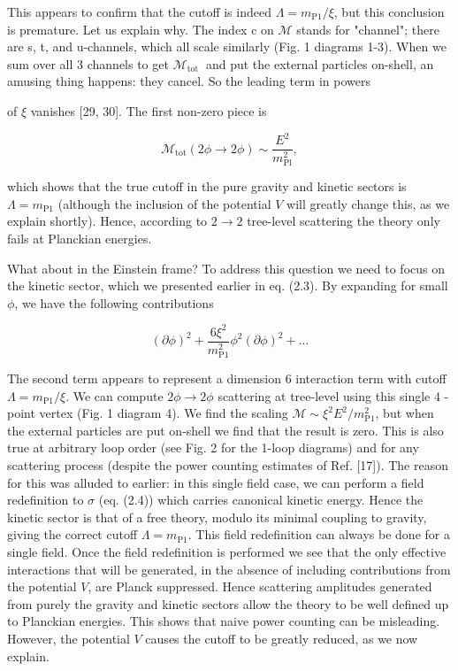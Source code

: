 This appears to confirm that the cutoff is indeed $\Lambda=m_{\mathrm{P} 1} / \xi$, but this conclusion is premature. Let us explain why. The index c on $\mathcal{M}$ stands for "channel"; there are s, t, and u-channels, which all scale similarly (Fig. 1 diagrams 1-3). When we sum over all 3 channels to get $\mathcal{M}_{\text {tot }}$ and put the external particles on-shell, an amusing thing happens: they cancel. So the leading term in powers

of $\xi$ vanishes [29, 30]. The first non-zero piece is

$$
\mathcal{M}_{\mathrm{tot}}(2 \phi \rightarrow 2 \phi) \sim \frac{E^2}{m_{\mathrm{Pl}}^2},
$$

which shows that the true cutoff in the pure gravity and kinetic sectors is $\Lambda=m_{\mathrm{P} 1}$ (although the inclusion of the potential $V$ will greatly change this, as we explain shortly). Hence, according to $2 \rightarrow 2$ tree-level scattering the theory only fails at Planckian energies.

What about in the Einstein frame? To address this question we need to focus on the kinetic sector, which we presented earlier in eq. (2.3). By expanding for small $\phi$, we have the following contributions

$$
(\partial \phi)^2+\frac{6 \xi^2}{m_{\mathrm{P} 1}^2} \phi^2(\partial \phi)^2+\ldots
$$


The second term appears to represent a dimension 6 interaction term with cutoff $\Lambda=m_{\mathrm{P} 1} / \xi$. We can compute $2 \phi \rightarrow 2 \phi$ scattering at tree-level using this single 4 -point vertex (Fig. 1 diagram 4). We find the scaling $\mathcal{M} \sim \xi^2 E^2 / m_{\mathrm{P} 1}^2$, but when the external particles are put on-shell we find that the result is zero. This is also true at arbitrary loop order (see Fig. 2 for the 1-loop diagrams) and for any scattering process (despite the power counting estimates of Ref. [17]). The reason for this was alluded to earlier: in this single field case, we can perform a field redefinition to $\sigma$ (eq. (2.4)) which carries canonical kinetic energy. Hence the kinetic sector is that of a free theory, modulo its minimal coupling to gravity, giving the correct cutoff $\Lambda=m_{\mathrm{P} 1}$. This field redefinition can always be done for a single field. Once the field redefinition is performed we see that the only effective interactions that will be generated, in the absence of including contributions from the potential $V$, are Planck suppressed. Hence scattering amplitudes generated from purely the gravity and kinetic sectors allow the theory to be well defined up to Planckian energies. This shows that naive power counting can be misleading. However, the potential $V$ causes the cutoff to be greatly reduced, as we now explain.

